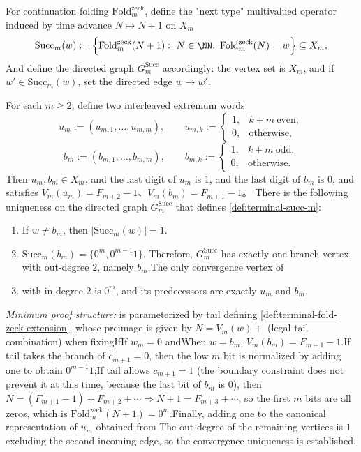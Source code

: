 \begin{enumerate}
\begin{definition}\label{def:terminal-succ-m}For continuation folding \(\mathrm{Fold}^{\mathrm{zeck}}_m\), define the "next type" multivalued operator induced by time advance \(N\mapsto N+1\) on \(X_m\)  \[
  \mathrm{Succ}_m(w):=\Bigl\{\mathrm{Fold}^{\mathrm{zeck}}_m(N+1):\ N\in\NN,\ \mathrm{Fold}^{\mathrm{zeck}}_m(N)=w\Bigr\}\subseteq X_m,
  \]
And define the directed graph \(G^{\mathrm{Succ}}_m\) accordingly: the vertex set is \(X_m\), and if \(w'\in\mathrm{Succ}_m(w)\), set the directed edge \(w\to w'\).  \end{definition}

\begin{theorem}\label{thm:terminal-succ-unique-branch-merge}For each \(m\ge 2\), define two interleaved extremum words  \[
  u_m:=(u_{m,1},\dots,u_{m,m}),\qquad
  u_{m,k}:=
  \begin{cases}
1,& k+m\ \text{even},\\0,& \text{otherwise},  \end{cases}
  \]
  \[
  b_m:=(b_{m,1},\dots,b_{m,m}),\qquad
  b_{m,k}:=
  \begin{cases}
1,& k+m\ \text{odd},\\0,& \text{otherwise}.  \end{cases}
  \]
Then \(u_m,b_m\in X_m\), and the last digit of \(u_m\) is \(1\), and the last digit of \(b_m\) is \(0\), and satisfies  \(V_m(u_m)=F_{m+2}-1\)、\(V_m(b_m)=F_{m+1}-1\)。
There is the following uniqueness on the directed graph \(G^{\mathrm{Succ}}_m\) that defines \ref{def:terminal-succ-m}:  \begin{enumerate}
\item If \(w\neq b_m\), then \(|\mathrm{Succ}_m(w)|=1\).\item \(\mathrm{Succ}_m(b_m)=\{0^m,0^{m-1}1\}\). Therefore, \(G^{\mathrm{Succ}}_m\) has exactly one branch vertex with out-degree \(2\), namely \(b_m\).The only convergence vertex of \item with in-degree \(2\) is \(0^m\), and its predecessors are exactly \(u_m\) and \(b_m\).  \end{enumerate}
\emph{Minimum proof structure:} is parameterized by tail defining \ref{def:terminal-fold-zeck-extension}, whose preimage is given by \(N=V_m(w)+\) (legal tail combination) when fixingIfIf \(w_m=0\) andWhen \(w=b_m\), \(V_m(b_m)=F_{m+1}-1\).If tail takes the branch of \(c_{m+1}=0\), then the low \(m\) bit is normalized by adding one to obtain \(0^{m-1}1\);If tail allows \(c_{m+1}=1\) (the boundary constraint does not prevent it at this time, because the last bit of \(b_m\) is \(0\)), then\(N=(F_{m+1}-1)+F_{m+2}+\cdots\Rightarrow N+1=F_{m+3}+\cdots\), so the first \(m\) bits are all zeros, which is \(\mathrm{Fold}^{\mathrm{zeck}}_m(N+1)=0^m\).Finally, adding one to the canonical representation of \(u_m\) obtained from The out-degree of the remaining vertices is \(1\) excluding the second incoming edge, so the convergence uniqueness is established.  \end{theorem}
  


\end{enumerate}
